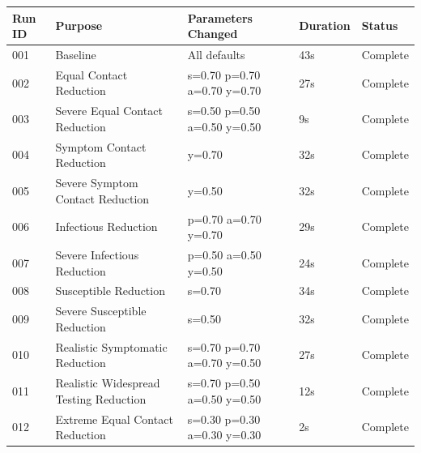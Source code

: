 \documentclass{article}
\begin{document}
\begin{tabular}{|l | l | l | l | l |}
  \hline
  Run ID & Purpose                                & Parameters Changed          & Duration & Status \\ [0.5ex]
  \hline\hline
  001    & Baseline                               & All defaults                & 43s      & Complete   \\
  \hline                                                                                     
  002    & Equal Contact Reduction                & s=0.70 p=0.70 a=0.70 y=0.70 & 27s      & Complete   \\
  \hline                                                                                    
  003    & Severe Equal Contact Reduction         & s=0.50 p=0.50 a=0.50 y=0.50 & 9s       & Complete   \\
  \hline                                                                                   
  004    & Symptom Contact Reduction              & y=0.70                      & 32s      & Complete   \\
  \hline                                                                                  
  005    & Severe Symptom Contact Reduction       & y=0.50                      & 32s      & Complete   \\
  \hline                                                                                 
  006    & Infectious Reduction                   & p=0.70 a=0.70 y=0.70        & 29s      & Complete   \\
  \hline                                                                                 
  007    & Severe Infectious Reduction            & p=0.50 a=0.50 y=0.50        & 24s      & Complete   \\
  \hline                                                                                 
  008    & Susceptible Reduction                  & s=0.70                      & 34s      & Complete   \\
  \hline                                                                                 
  009    & Severe Susceptible Reduction           & s=0.50                      & 32s      & Complete   \\
  \hline                                                                                 
  010    & Realistic Symptomatic Reduction        & s=0.70 p=0.70 a=0.70 y=0.50 & 27s      & Complete   \\
  \hline                                                                                 
  011    & Realistic Widespread Testing Reduction & s=0.70 p=0.50 a=0.50 y=0.50 & 12s      & Complete   \\
  \hline                                                                                 
  012    & Extreme Equal Contact Reduction        & s=0.30 p=0.30 a=0.30 y=0.30 & 2s       & Complete   \\
  \hline\hline
\end{tabular}
\end{document}
